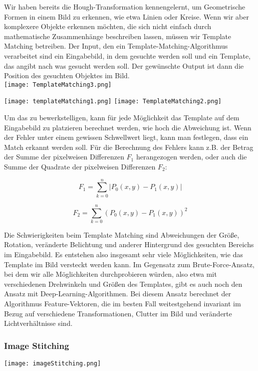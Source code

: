 Wir haben bereits die Hough-Transformation kennengelernt, um Geometrische Formen in einem Bild zu erkennen, wie etwa Linien oder Kreise. Wenn wir aber komplexere Objekte erkennen möchten, die sich nicht einfach durch mathematische Zusammenhänge beschreiben lassen, müssen wir Template Matching betreiben. Der Input, den ein Template-Matching-Algorithmus verarbeitet sind ein Eingabebild, in dem gesuchte werden soll und ein Template, das angibt nach was gesucht werden soll. Der gewünschte Output ist dann die Position des gesuchten Objektes im Bild. \\

\texttt{[image: TemplateMatching3.png]}

\texttt{[image: templateMatching1.png]}
\texttt{[image: TemplateMatching2.png]}

Um das zu bewerkstelligen, kann für jede Möglichkeit das Template auf dem Eingabebild zu platzieren berechnet werden, wie hoch die Abweichung ist. Wenn der Fehler unter einem gewissen Schwellwert liegt, kann man festlegen, dass ein Match erkannt werden soll. Für die Berechnung des Fehlers kann z.B. der Betrag der Summe der pixelweisen Differenzen $F_{1}$ herangezogen werden, oder auch die Summe der Quadrate der pixelweisen Differenzen $F_{2}$:

\[
    F_{1} = \sum_{k=0}^{n}|P_{0}(x, y) - P_{1}(x, y)|
\]

\[
    F_{2} = \sum_{k=0}^{n}(P_{0}(x, y) - P_{1}(x, y))^{2}
\]

Die Schwierigkeiten beim Template Matching sind Abweichungen der Größe, Rotation, veränderte Belichtung und anderer Hintergrund des gesuchten Bereichs im Eingabebild. Es entstehen also insgesamt sehr viele Möglichkeiten, wie das Template im Bild versteckt werden kann. Im Gegensatz zum Brute-Force-Ansatz, bei dem wir alle Möglichkeiten durchprobieren würden, also etwa mit verschiedenen Drehwinkeln und Größen des Templates, gibt es auch noch den Ansatz mit Deep-Learning-Algorithmen. Bei diesem Ansatz berechnet der Algorithmus Feature-Vektoren, die im besten Fall weitestgehend invariant im Bezug auf verschiedene Transformationen, Clutter im Bild und veränderte Lichtverhältnisse sind.

\subsubsection{Image Stitching}

\texttt{[image: imageStitching.png]}

